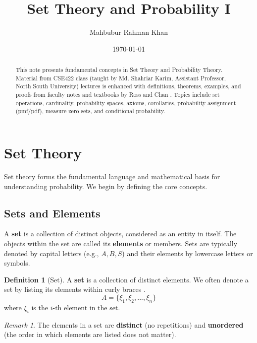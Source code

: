 \documentclass[12pt, a4paper]{article}
\title{Set Theory and Probability I}
\author{Mahbubur Rahman Khan}
\date{\today}
\theoremstyle{definition}
\newtheorem{definition}{Definition}[section]
\theoremstyle{plain}
\theoremstyle{remark}
\newtheorem{remark}{Remark}[section]
\begin{document}
\maketitle

\begin{abstract}
    This note presents fundamental concepts in Set Theory and Probability Theory. Material from CSE422 class (taught by Md. Shahriar Karim, Assistant Professor, North South University) lectures is enhanced with definitions, theorems, examples, and proofs from faculty notes \cite{faculty_set, faculty_prob} and textbooks by Ross \cite{ross} and Chan \cite{chan}. Topics include set operations, cardinality, probability spaces, axioms, corollaries, probability assignment (pmf/pdf), measure zero sets, and conditional probability.
\end{abstract}

\thispagestyle{empty}
\tableofcontents
\newpage
\setcounter{page}{1}

\section{Set Theory}

Set theory forms the fundamental language and mathematical basis for understanding probability. We begin by defining the core concepts.

\subsection{Sets and Elements}

A \textbf{set} is a collection of distinct objects, considered as an entity in itself. The objects within the set are called its \textbf{elements} or members. Sets are typically denoted by capital letters (e.g., $A, B, S$) and their elements by lowercase letters or symbols.

\begin{definition}[Set]
    A \textbf{set} is a collection of distinct elements. We often denote a set by listing its elements within curly braces \cite{faculty_set, chan}.
    $$A = \{\xi_1, \xi_2, ..., \xi_n\}$$
    where $\xi_i$ is the $i$-th element in the set.
\end{definition}

\begin{remark}
    The elements in a set are \textbf{distinct} (no repetitions) and \textbf{unordered} (the order in which elements are listed does not matter).
\end{remark}
\end{document}
